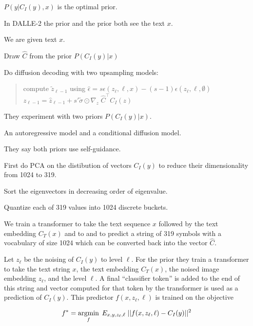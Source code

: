 {\vfill
$P(y|C_I(y),x)$ is the optimal prior.

\vfill
In DALLE-2 the prior and the prior both see the text $x$.


We are given text $x$.

\vfill
Draw $\hat{C}$ from the prior $P(C_I(y)|x)$

\vfill
Do diffusion decoding with two upsampling models:

\vfill
\begin{quotation}
compute $\tilde{z}_{\ell-1}$ using $\hat{\epsilon} = s\epsilon(z_\ell,\ell,x) - (s-1)\epsilon(z_\ell,\ell,\emptyset)$
\vfill
$z_{\ell-1} = \hat{z}_{\ell-1} + s'\tilde{\sigma}\odot\nabla_z\;\hat{C}^\top C_I(z)$
\end{quotation}


They experiment with two priors $P(C_I(y)|x)$.

\vfill
An autoregressive model and a conditional diffusion model.

\vfill
They say both priors use self-guidance.


First do PCA on the distibution of vectors $C_I(y)$ to reduce their dimensionality from 1024 to 319.

\vfill
Sort the eigenvectors in decreasing order of eigenvalue.

\vfill
Quantize each of 319 values into 1024 discrete buckets.

\vfill
We train a transformer to take the text sequence $x$ followed by the text embedding $C_T(x)$ and to
and to predict a string of 319 symbols with a vocabulary of size 1024 which can be converted back into the vector $\hat{C}$.


Let $z_\ell$ be the noising of $C_I(y)$ to level $\ell$.  For the prior they train a transformer to take the text string $x$, the text embedding $C_T(x)$, the noised
image embedding $z_\ell$, and the level $\ell$. A final ``classifier token'' is added to the end of this string and vector computed for that token by the transformer is used as a prediction of $C_I(y)$.
This predictor $f(x,z_\ell,\ell)$ is trained on the objective

$$f^* = \operatorname*{argmin}_f\;E_{x,y,z_\ell,\ell}\; ||f(x,z_\ell,\ell) - C_I(y)||^2$$


}
